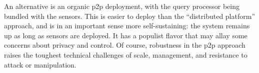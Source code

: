 \documentclass[twocolumn,10pt]{article}
\begin{document}
An alternative is an organic p2p deployment, with the query
processor being bundled with the sensors.  This is easier to deploy
than the ``distributed platform'' 
approach, and is in an important sense more self-sustaining: the
system remains up as long as sensors are deployed.  It has a populist
flavor that may allay some concerns about privacy and control.
Of course, robustness in the p2p approach raises the toughest
technical challenges of scale, management, and resistance to attack or
manipulation. 

 
\footnotesize

\end{document}
